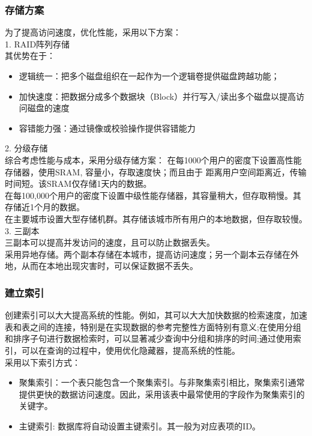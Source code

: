{\subsubsection{\color{red} 存储方案}
为了提高访问速度，优化性能，采用以下方案：\\
1. RAID阵列存储 \\
其优势在于：\\
\begin{itemize}
    \item 逻辑统一：把多个磁盘组织在一起作为一个逻辑卷提供磁盘跨越功能；
    \item 加快速度：把数据分成多个数据块（Block）并行写入/读出多个磁盘以提高访问磁盘的速度
    \item 容错能力强：通过镜像或校验操作提供容错能力
\end{itemize}
2. 分级存储 \\
综合考虑性能与成本，采用分级存储方案：
在每1000个用户的密度下设置高性能存储器，使用SRAM, 容量小，存取速度快；而且由于
距离用户空间距离近，传输时间短。该SRAM仅存储1天内的数据。\\
在每100,000个用户的密度下设置中级性能存储器，其容量稍大，但存取稍慢。其存储近1个月的数据。\\
在主要城市设置大型存储机群。其存储该城市所有用户的本地数据，但存取较慢。\\
3. 三副本 \\
三副本可以提高并发访问的速度，且可以防止数据丢失。\\
采用异地存储。两个副本存储在本城市，提高访问速度；另一个副本云存储在外地，从而在本地出现灾害时，可以保证数据不丢失。

\subsubsection{\color{red} 建立索引}

创建索引可以大大提高系统的性能。例如，其可以大大加快数据的检索速度，加速表和表之间的连接，特别是在实现数据的参考完整性方面特别有意义;在使用分组和排序子句进行数据检索时，可以显著减少查询中分组和排序的时间;通过使用索引，可以在查询的过程中，使用优化隐藏器，提高系统的性能。\\

采用以下索引方式：
\begin{itemize}
    \item 聚集索引：一个表只能包含一个聚集索引。与非聚集索引相比，聚集索引通常提供更快的数据访问速度。因此，采用该表中最常使用的字段作为聚集索引的关键字。
    \item 主键索引: 数据库将自动设置主键索引。其一般为对应表项的ID。
\end{itemize}

}
